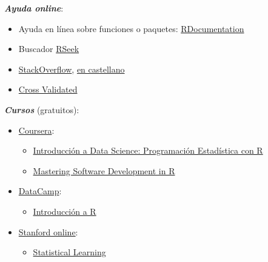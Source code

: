 \documentclass[
]{book}
\providecommand{\tightlist}{%
  \setlength{\itemsep}{0pt}\setlength{\parskip}{0pt}}
\theoremstyle{break}
\theoremstyle{definition}
\theoremstyle{definition}
\theoremstyle{definition}
\theoremstyle{definition}
\theoremstyle{remark}
\begin{document}
\textbf{\emph{Ayuda online}}:

\begin{itemize}
\item
  Ayuda en línea sobre funciones o paquetes: \href{https://www.rdocumentation.org/}{RDocumentation}
\item
  Buscador \href{http://rseek.org/}{RSeek}
\item
  \href{http://stackoverflow.com/questions/tagged/r}{StackOverflow}, \href{https://es.stackoverflow.com/questions/tagged/r}{en castellano}
\item
  \href{https://stats.stackexchange.com}{Cross Validated}
\end{itemize}

\textbf{\emph{Cursos}} (gratuitos):

\begin{itemize}
\item
  \href{https://www.coursera.org/}{Coursera}:

  \begin{itemize}
  \item
    \href{https://www.coursera.org/learn/intro-data-science-programacion-estadistica-r}{Introducción a Data Science: Programación Estadística con R}
  \item
    \href{https://www.coursera.org/specializations/r}{Mastering Software Development in R}
  \end{itemize}
\end{itemize}

\begin{itemize}
\item
  \href{https://www.datacamp.com/courses}{DataCamp}:

  \begin{itemize}
  \tightlist
  \item
    \href{https://www.datacamp.com/courses/introduccion-a-r/}{Introducción a R}
  \end{itemize}
\end{itemize}

\begin{itemize}
\item
  \href{http://online.stanford.edu/courses}{Stanford online}:

  \begin{itemize}
  \tightlist
  \item
    \href{http://online.stanford.edu/course/statistical-learning}{Statistical Learning}
  \end{itemize}
\end{itemize}
\end{document}
